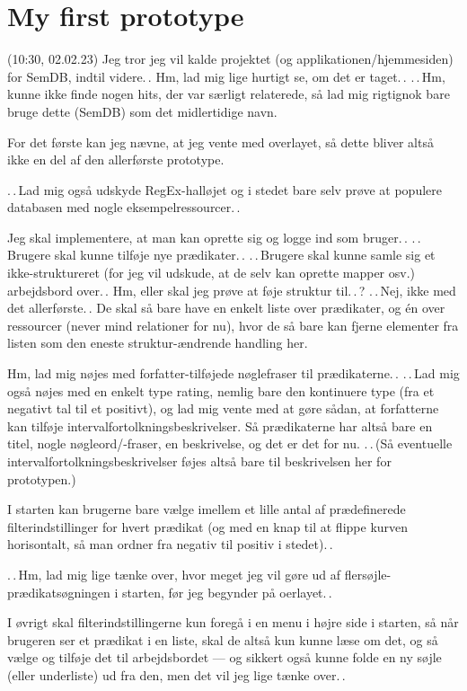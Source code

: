 \documentclass{report}
\begin{document}
\section{My first prototype}

(10:30, 02.02.23) Jeg tror jeg vil kalde projektet (og applikationen/hjemmesiden) for SemDB, indtil videre.\,. Hm, lad mig lige hurtigt se, om det er taget.\,. .\,.\,Hm, kunne ikke finde nogen hits, der var særligt relaterede, så lad mig rigtignok bare bruge dette (SemDB) som det midlertidige navn.

For det første kan jeg nævne, at jeg vente med overlayet, så dette bliver altså ikke en del af den allerførste prototype. 

.\,.\,Lad mig også udskyde RegEx-halløjet og i stedet bare selv prøve at populere databasen med nogle eksempelressourcer.\,.

Jeg skal implementere, at man kan oprette sig og logge ind som bruger.\,. .\,.\,Brugere skal kunne tilføje nye prædikater.\,. .\,.\,Brugere skal kunne samle sig et ikke-struktureret (for jeg vil udskude, at de selv kan oprette mapper osv.) arbejdsbord over.\,. Hm, eller skal jeg prøve at føje struktur til.\,.\,? .\,.\,Nej, ikke med det allerførste.\,. De skal så bare have en enkelt liste over prædikater, og én over ressourcer (never mind relationer for nu), hvor de så bare kan fjerne elementer fra listen som den eneste struktur-ændrende handling her. 

Hm, lad mig nøjes med forfatter-tilføjede nøglefraser til prædikaterne.\,. .\,.\,Lad mig også nøjes med en enkelt type rating, nemlig bare den kontinuere type (fra et negativt tal til et positivt), og lad mig vente med at gøre sådan, at forfatterne kan tilføje intervalfortolkningsbeskrivelser. Så prædikaterne har altså bare en titel, nogle nøgleord/-fraser, en beskrivelse, og det er det for nu. .\,.\,(Så eventuelle intervalfortolkningsbeskrivelser føjes altså bare til beskrivelsen her for prototypen.)

I starten kan brugerne bare vælge imellem et lille antal af prædefinerede filterindstillinger for hvert prædikat (og med en knap til at flippe kurven horisontalt, så man ordner fra negativ til positiv i stedet).\,. 

.\,.\,Hm, lad mig lige tænke over, hvor meget jeg vil gøre ud af flersøjle-prædikatsøgningen i starten, før jeg begynder på oerlayet.\,.

I øvrigt skal filterindstillingerne kun foregå i en menu i højre side i starten, så når brugeren ser et prædikat i en liste, skal de altså kun kunne læse om det, og så vælge og tilføje det til arbejdsbordet --- og sikkert også kunne folde en ny søjle (eller underliste) ud fra den, men det vil jeg lige tænke over.\,. 
\end{document}
